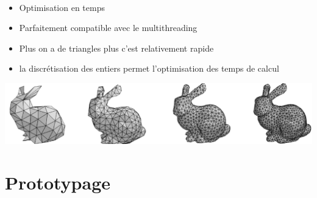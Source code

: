\begin{frame}[fragile=singleslide]{\insertsectionhead}

  \framesubtitle{\insertsubsectionhead}
  \begin{itemize}
      \item Optimisation en temps
      \item Parfaitement compatible avec le multithreading
      \item Plus on a de triangles plus c'est relativement rapide
      \item la discrétisation des entiers permet l’optimisation des temps de calcul
    \end{itemize}
    \vspace{0.6cm}
    \begin{center}
        \includegraphics[scale=0.2]{resources/lapin.png}
    \end{center}
\end{frame}

\section{Prototypage}

